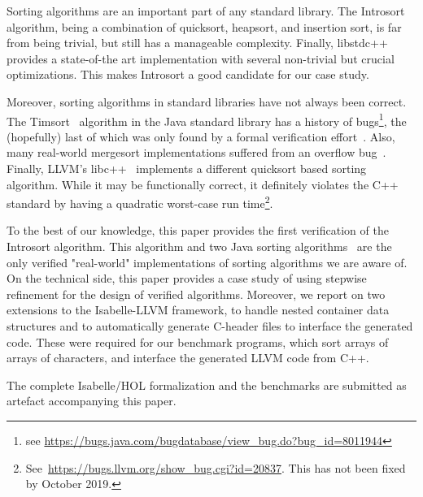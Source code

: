 \documentclass[sigplan,10pt,anonymous,review]{acmart}\settopmatter{printfolios=true,printccs=false,printacmref=false}
\theoremstyle{definition}
\begin{document}
  Sorting algorithms are an important part of any standard library. The Introsort algorithm,
  being a combination of quicksort, heapsort, and insertion sort, is far from being trivial, but still
  has a manageable complexity. Finally, libstdc++ provides a state-of-the art implementation with several
  non-trivial but crucial optimizations. This makes Introsort a good candidate for our case study.

  Moreover, sorting algorithms in standard libraries have not always been correct.
  The Timsort~\cite{Peters02} algorithm in the Java standard library has a history of bugs\footnote{see \url{https://bugs.java.com/bugdatabase/view_bug.do?bug_id=8011944}}, the (hopefully) last of which was only found by a formal verification effort~\cite{GRBBH15}.
  Also, many real-world mergesort implementations suffered from an overflow bug~\cite{bs_flaw_blogpost}.
  Finally, LLVM's libc++~\cite{libc++} implements a different quicksort based sorting algorithm. While it may be functionally correct,
  it definitely violates the C++ standard by having a quadratic worst-case run time\footnote{See~\url{https://bugs.llvm.org/show_bug.cgi?id=20837}. This has not been fixed by October 2019.}.

  To the best of our knowledge, this paper provides the first verification of the Introsort algorithm.
  This algorithm and two Java sorting algorithms~\cite{GRBBH15,BSSU17} are the only verified "real-world" implementations
  of sorting algorithms we are aware of. On the technical side, this paper provides a case study of using stepwise refinement
  for the design of verified algorithms.
  Moreover, we report on two extensions to the Isabelle-LLVM framework, to handle nested container data structures and to automatically
  generate C-header files to interface the generated code. These were required for our benchmark programs, which sort arrays of arrays of characters,
  and interface the generated LLVM code from C++.

  The complete Isabelle/HOL formalization and the benchmarks are submitted as artefact accompanying this paper.


%
%
%
%
\end{document}
